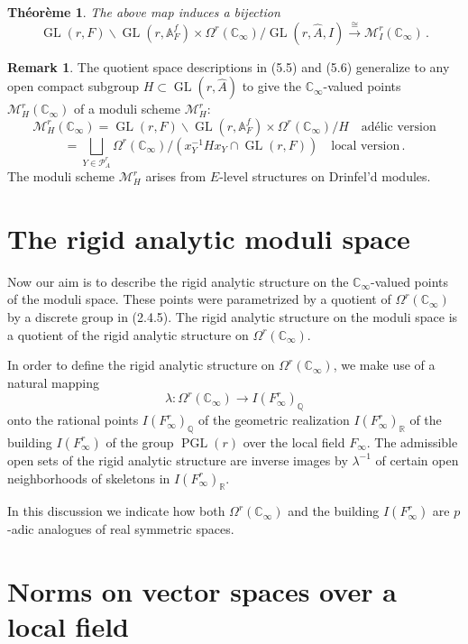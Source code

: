 \documentclass[12pt,a4paper]{article}
\theoremstyle{plain}
\newtheorem{theorem}{Th\'eor\`eme}[section]
\theoremstyle{definition}
\newtheorem{remark}{Remark}[section]
\theoremstyle{remark}
\DeclareMathOperator{\GL}{GL}
\DeclareMathOperator{\PGL}{PGL}
\begin{document}
\begin{theorem}
The above map induces a bijection
\[
\GL(r,F) \backslash \GL(r,\mathbb{A}_F^f) \times \Omega^r(\mathbb{C}_\infty)/\GL(r,\widehat{A},I) \xrightarrow{\;\cong\;} \mathcal{M}_I^r(\mathbb{C}_\infty) \,.
\]
\end{theorem}

\begin{remark}
The quotient space descriptions in (5.5) and (5.6) generalize to any open 
compact subgroup $H \subset \GL(r,\widehat{A})$ to give the $\mathbb{C}_\infty$-valued 
points $\mathcal{M}_H^r(\mathbb{C}_\infty)$ of a moduli scheme $\mathcal{M}_H^r$:
\[
\mathcal{M}_H^r(\mathbb{C}_\infty) = \GL(r,F) \backslash \GL(r,\mathbb{A}_F^f) \times \Omega^r(\mathbb{C}_\infty)/H \quad\text{ad\'elic version}
\]
\[
= \bigsqcup_{Y \in \mathcal{P}_A^r} \Omega^r(\mathbb{C}_\infty)/(x_Y^{-1}Hx_Y \cap \GL(r,F)) \quad\text{local version} \,.
\]
The moduli scheme $\mathcal{M}_H^r$ arises from $E$-level structures on 
Drinfel'd modules.
\end{remark}


\section*{The rigid analytic moduli space}

Now our aim is to describe the rigid analytic structure on the 
$\mathbb{C}_\infty$-valued points of the moduli space. These points were 
parametrized by a quotient of $\Omega^r(\mathbb{C}_\infty)$ by a discrete group 
in (2.4.5). The rigid analytic structure on the moduli space is a quotient 
of the rigid analytic structure on $\Omega^r(\mathbb{C}_\infty)$.

In order to define the rigid analytic structure on $\Omega^r(\mathbb{C}_\infty)$, 
we make use of a natural mapping
\[
\lambda\colon \Omega^r(\mathbb{C}_\infty) \longrightarrow I(F_\infty^r)_\mathbb{Q}
\]
onto the rational points $I(F_\infty^r)_\mathbb{Q}$ of the geometric realization 
$I(F_\infty^r)_\mathbb{R}$ of the building $I(F_\infty^r)$ of the group 
$\PGL(r)$ over the local field $F_\infty$. The admissible open sets of the 
rigid analytic structure are inverse images by $\lambda^{-1}$ of certain open 
neighborhoods of skeletons in $I(F_\infty^r)_\mathbb{R}$.

In this discussion we indicate how both $\Omega^r(\mathbb{C}_\infty)$ and the 
building $I(F_\infty^r)$ are $p$-adic analogues of real symmetric spaces.


\section{Norms on vector spaces over a local field}
\end{document}
